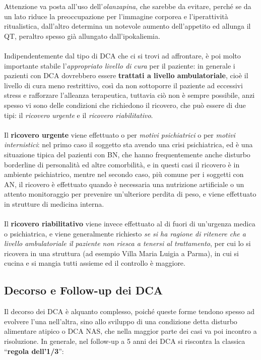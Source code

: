 Attenzione va posta all'uso dell'\emph{olanzapina}, che sarebbe da
evitare, perché se da un lato riduce la preoccupazione per l'immagine
corporea e l'iperattività ritualistica, dall'altro determina un notevole
aumento dell'appetito ed allunga il QT, peraltro spesso già allungato
dall'ipokaliemia.
\\\\
Indipendentemente dal tipo di DCA che ci si trovi ad affrontare, è poi
molto importante stabile l'\emph{appropriato livello di cura} per il
paziente: in generale i pazienti con DCA dovrebbero essere
\textbf{trattati a livello ambulatoriale}, cioè il livello di cura meno
restrittivo, così da non sottoporre il paziente ad eccessivi stress e
rafforzare l'alleanza terapeutica, tuttavia ciò non è sempre possibile,
anzi spesso vi sono delle condizioni che richiedono il ricovero, che può
essere di due tipi: il \emph{ricovero urgente} e il \emph{ricovero
riabilitativo}.
\\\\
Il \textbf{ricovero urgente} viene effettuato o per \emph{motivi
psichiatrici} o per \emph{motivi internistici}: nel primo caso il
soggetto sta avendo una crisi psichiatrica, ed è una situazione tipica
del pazienti con BN, che hanno frequentemente anche disturbo borderline
di personalità ed altre comorbilità, e in questi casi il ricovero è in
ambiente psichiatrico, mentre nel secondo caso, più comune per i
soggetti con AN, il ricovero è effettuato quando è necessaria una
nutrizione artificiale o un attento monitoraggio per prevenire
un'ulteriore perdita di peso, e viene effettuato in strutture di
medicina interna.
\\\\
Il \textbf{ricovero riabilitativo} viene invece effettuato al di fuori
di un'urgenza medica o psichiatrica, e viene generalmente richiesto
\emph{se si ha ragione di ritenere che a livello ambulatoriale il
paziente non riesca a tenersi al trattamento}, per cui lo si ricovera in
una struttura (ad esempio Villa Maria Luigia a Parma), in cui si cucina
e si mangia tutti assieme ed il controllo è maggiore.

\subsection{Decorso e Follow-up dei DCA}

Il decorso dei DCA è alquanto complesso, poiché queste forme tendono
spesso ad evolvere l'una nell'altra, sino allo sviluppo di una
condizione detta disturbo alimentare atipico o DCA NAS, che nella
maggior parte dei casi va poi incontro a risoluzione. In generale, nel
follow-up a 5 anni dei DCA si riscontra la classica ``\textbf{regola
dell'1/3}'':

